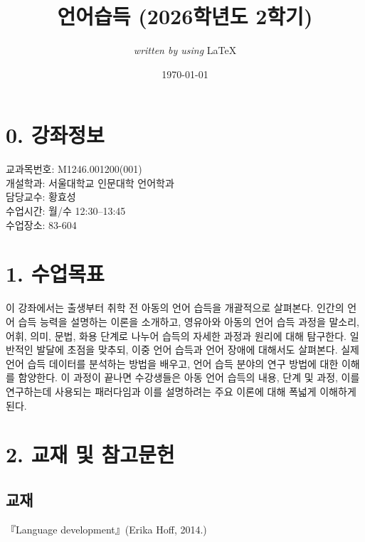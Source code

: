 \documentclass{article}
\begin{document}
\title{언어습득 (2026학년도 2학기)}
\author{\textit{written by using} \LaTeX}
\date{\today}
\maketitle
\thispagestyle{fancy}
\setcounter{secnumdepth}{0}
\bigskip

\section{0. 강좌정보}
\medskip
교과목번호: M1246.001200(001)\\
개설학과: 서울대학교 인문대학 언어학과\\
담당교수: 황효성\\
수업시간: 월/수 12:30--13:45\\
수업장소: 83-604

\section{1. 수업목표}
\medskip
이 강좌에서는 출생부터 취학 전 아동의 언어 습득을 개괄적으로 살펴본다. 인간의 언어 습득 능력을 설명하는 이론을 소개하고, 영유아와 아동의 언어 습득 과정을 말소리, 어휘, 의미, 문법, 화용 단계로 나누어 습득의 자세한 과정과 원리에 대해 탐구한다. 일반적인 발달에 초점을 맞추되, 이중 언어 습득과 언어 장애에 대해서도 살펴본다. 실제 언어 습득 데이터를 분석하는 방법을 배우고, 언어 습득 분야의 연구 방법에 대한 이해를 함양한다. 이 과정이 끝나면 수강생들은 아동 언어 습득의 내용, 단계 및 과정, 이를 연구하는데 사용되는 패러다임과 이를 설명하려는 주요 이론에 대해 폭넓게 이해하게 된다.

\section{2. 교재 및 참고문헌}
\medskip
\subsection{교재}
『Language development』(Erika Hoff, 2014.)

\newpage
\end{document}

